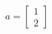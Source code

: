 \documentclass[preview]{standalone}
\begin{document}
\begin{center}
\[a = \begin{bmatrix} 1 \\ 2 \end{bmatrix}\]
\end{center}
\end{document}
